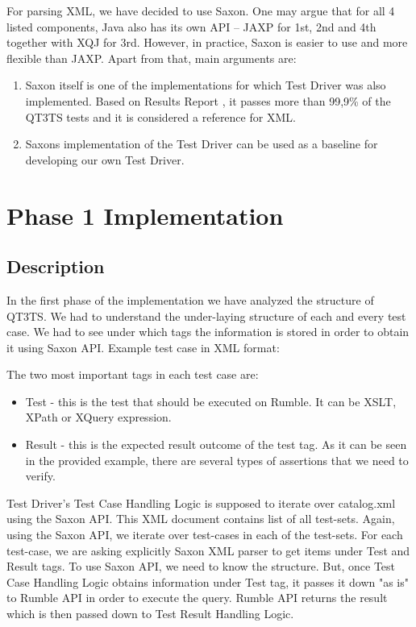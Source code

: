For parsing XML, we have decided to use Saxon. One may argue that for all 4 listed components, Java also has its own API – JAXP for 1st, 2nd and 4th together with XQJ for 3rd. However, in practice, Saxon is easier to use and more flexible than JAXP. Apart from that, main arguments are:
\begin{enumerate}
	\item Saxon itself is one of the implementations for which Test Driver was also implemented. Based on Results Report \cite{SaxonReport}, it passes more than 99,9\% of the QT3TS tests and it is considered a reference for XML.
	\item Saxons implementation of the Test Driver can be used as a baseline for developing our own Test Driver. 
\end{enumerate}

\section{Phase 1 Implementation}
\subsection{Description}
\label{Phase1_Description}
In the first phase of the implementation we have analyzed the structure of QT3TS. We had to understand the under-laying structure of each and every test case. We had to see under which tags the information is stored in order to obtain it using Saxon API. Example test case in XML format:



The two most important tags in each test case are:
\begin{itemize}
	\item Test  - this is the test that should be executed on Rumble. It can be XSLT, XPath or XQuery expression.
	\item Result - this is the expected result outcome of the test tag. As it can be seen in the provided example, there are several types of assertions that we need to verify.
\end{itemize}

Test Driver's Test Case Handling Logic is supposed to iterate over catalog.xml using the Saxon API. This XML document contains list of all test-sets. Again, using the Saxon API, we iterate over test-cases in each of the test-sets. For each test-case, we are asking explicitly Saxon XML parser to get items under Test and Result tags. To use Saxon API, we need to know the structure. But, once Test Case Handling Logic obtains information under Test tag, it passes it down "as is" to Rumble API in order to execute the query. Rumble API returns the result which is then passed down to Test Result Handling Logic. 

